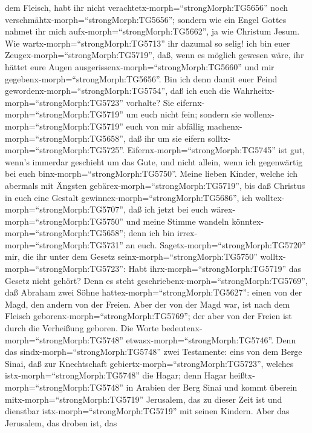 dem Fleisch, habt ihr nicht verachtetx-morph=``strongMorph:TG5656'' noch
verschmähtx-morph=``strongMorph:TG5656''; sondern wie ein Engel Gottes
nahmet ihr mich aufx-morph=``strongMorph:TG5662'', ja wie Christum
Jesum.  Wie wartx-morph=``strongMorph:TG5713'' ihr dazumal
so selig! ich bin euer Zeugex-morph=``strongMorph:TG5719'', daß, wenn es
möglich gewesen wäre, ihr hättet eure Augen
ausgerissenx-morph=``strongMorph:TG5660'' und mir
gegebenx-morph=``strongMorph:TG5656''.  Bin ich denn damit
euer Feind gewordenx-morph=``strongMorph:TG5754'', daß ich euch die
Wahrheitx-morph=``strongMorph:TG5723'' vorhalte?  Sie
eifernx-morph=``strongMorph:TG5719'' um euch nicht fein; sondern sie
wollenx-morph=``strongMorph:TG5719'' euch von mir abfällig
machenx-morph=``strongMorph:TG5658'', daß ihr um sie eifern
solltx-morph=``strongMorph:TG5725''. 
Eifernx-morph=``strongMorph:TG5745'' ist gut, wenn's immerdar geschieht
um das Gute, und nicht allein, wenn ich gegenwärtig bei euch
binx-morph=``strongMorph:TG5750''.  Meine lieben Kinder,
welche ich abermals mit Ängsten gebärex-morph=``strongMorph:TG5719'',
bis daß Christus in euch eine Gestalt
gewinnex-morph=``strongMorph:TG5686'',  ich
wolltex-morph=``strongMorph:TG5707'', daß ich jetzt bei euch
wärex-morph=``strongMorph:TG5750'' und meine Stimme wandeln
könntex-morph=``strongMorph:TG5658''; denn ich bin
irrex-morph=``strongMorph:TG5731'' an euch. 
Sagetx-morph=``strongMorph:TG5720'' mir, die ihr unter dem Gesetz
seinx-morph=``strongMorph:TG5750'' wolltx-morph=``strongMorph:TG5723'':
Habt ihrx-morph=``strongMorph:TG5719'' das Gesetz nicht gehört?
 Denn es steht geschriebenx-morph=``strongMorph:TG5769'',
daß Abraham zwei Söhne hattex-morph=``strongMorph:TG5627'': einen von
der Magd, den andern von der Freien.  Aber der von der Magd
war, ist nach dem Fleisch geborenx-morph=``strongMorph:TG5769''; der
aber von der Freien ist durch die Verheißung geboren.  Die
Worte bedeutenx-morph=``strongMorph:TG5748''
etwasx-morph=``strongMorph:TG5746''. Denn das
sindx-morph=``strongMorph:TG5748'' zwei Testamente: eins von dem Berge
Sinai, daß zur Knechtschaft gebiertx-morph=``strongMorph:TG5723'',
welches istx-morph=``strongMorph:TG5748'' die Hagar;  denn
Hagar heißtx-morph=``strongMorph:TG5748'' in Arabien der Berg Sinai und
kommt überein mitx-morph=``strongMorph:TG5719'' Jerusalem, das zu dieser
Zeit ist und dienstbar istx-morph=``strongMorph:TG5719'' mit seinen
Kindern.  Aber das Jerusalem, das droben ist, das
